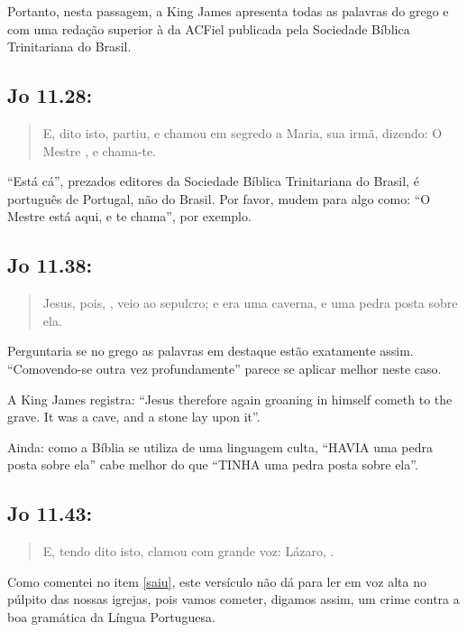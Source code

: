 Portanto, nesta passagem, a King James apresenta todas as palavras do grego e com uma redação superior à da ACFiel publicada pela Sociedade Bíblica Trinitariana do Brasil.

\subsection*{Jo 11.28:}
\begin{quote}
    \small
E, dito isto, partiu, e chamou em segredo a Maria, sua irmã, dizendo: O Mestre , e chama-te.
\end{quote}

``Está cá'', prezados editores da Sociedade Bíblica Trinitariana do
Brasil, é português de Portugal, não do Brasil. Por favor, mudem para
algo como: ``O Mestre está aqui, e te chama'', por exemplo.

\subsection*{Jo 11.38:}
\begin{quote}
    \small
Jesus, pois, , veio ao sepulcro; e era uma caverna, e  uma pedra posta sobre ela.
\end{quote}

Perguntaria se no grego as palavras em destaque estão exatamente assim. ``Comovendo-se outra vez profundamente'' parece se aplicar melhor neste caso.

A  King James registra: ``Jesus therefore again groaning in himself cometh to the grave. It was a cave, and a stone lay upon it''.

Ainda: como a Bíblia se utiliza de uma linguagem culta, ``HAVIA uma pedra posta sobre ela'' cabe melhor do que ``TINHA uma pedra posta sobre ela''.

\subsection*{Jo 11.43:}
\begin{quote}
    \small
E, tendo dito isto, clamou com grande voz: Lázaro, .
\end{quote}

Como comentei no item \ref{saiu}, este versículo não dá para ler em voz alta no púlpito das nossas igrejas, pois vamos cometer, digamos assim, um crime contra a boa gramática da Língua Portuguesa.

